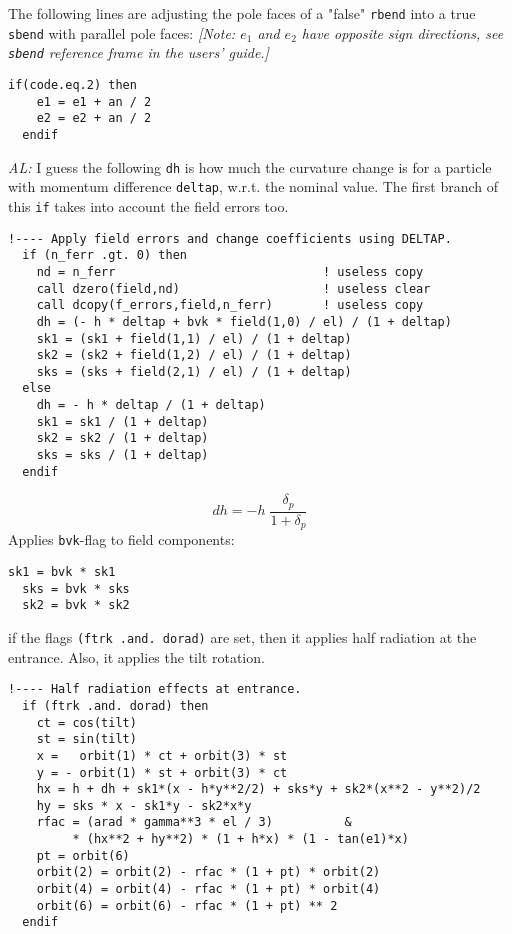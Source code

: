 \documentclass{cern-art} %
\renewcommand{\L}[1]{\lstinline[firstnumber=last]{#1}}
\begin{document}
The following lines are adjusting the pole faces of a "false" \L{rbend} into a true \L{sbend} with parallel pole faces: {\em [Note: $e_1$ and $e_2$ have opposite sign directions, see \L{sbend} reference frame in the users' guide.]}
\begin{lstlisting}[firstnumber=last]
  if(code.eq.2) then
    e1 = e1 + an / 2
    e2 = e2 + an / 2
  endif
\end{lstlisting}
{\em AL:} I guess the following \L{dh} is how much the curvature change is for a particle with momentum difference \L{deltap}, w.r.t. the nominal value. The first branch of this \L{if} takes into account the field errors too.
\begin{lstlisting}[firstnumber=last]
  !---- Apply field errors and change coefficients using DELTAP.
  if (n_ferr .gt. 0) then
    nd = n_ferr                             ! useless copy
    call dzero(field,nd)                    ! useless clear
    call dcopy(f_errors,field,n_ferr)       ! useless copy
    dh = (- h * deltap + bvk * field(1,0) / el) / (1 + deltap)
    sk1 = (sk1 + field(1,1) / el) / (1 + deltap)
    sk2 = (sk2 + field(1,2) / el) / (1 + deltap)
    sks = (sks + field(2,1) / el) / (1 + deltap)
  else
    dh = - h * deltap / (1 + deltap)
    sk1 = sk1 / (1 + deltap)
    sk2 = sk2 / (1 + deltap)
    sks = sks / (1 + deltap)
  endif
\end{lstlisting}
\[
dh = -h\; \frac{\delta_p}{1+\delta_p}
\]
Applies \L{bvk}-flag to field components:
\begin{lstlisting}[firstnumber=last]
  sk1 = bvk * sk1
  sks = bvk * sks
  sk2 = bvk * sk2
\end{lstlisting}
  if the flags \L{(ftrk .and. dorad)} are set, then it applies half radiation at the entrance. Also, it applies the tilt rotation.
\begin{lstlisting}[firstnumber=last]
  !---- Half radiation effects at entrance.
  if (ftrk .and. dorad) then
    ct = cos(tilt)
    st = sin(tilt)
    x =   orbit(1) * ct + orbit(3) * st
    y = - orbit(1) * st + orbit(3) * ct
    hx = h + dh + sk1*(x - h*y**2/2) + sks*y + sk2*(x**2 - y**2)/2
    hy = sks * x - sk1*y - sk2*x*y
    rfac = (arad * gamma**3 * el / 3)          &
         * (hx**2 + hy**2) * (1 + h*x) * (1 - tan(e1)*x)
    pt = orbit(6)
    orbit(2) = orbit(2) - rfac * (1 + pt) * orbit(2)
    orbit(4) = orbit(4) - rfac * (1 + pt) * orbit(4)
    orbit(6) = orbit(6) - rfac * (1 + pt) ** 2
  endif
\end{lstlisting}


\end{document}
